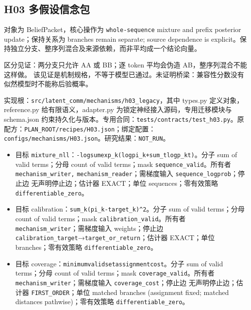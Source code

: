 \documentclass[
  10pt,
]{article}
\begin{document}
\subsection{H03
多假设信念包}\label{h03-ux591aux5047ux8bbeux4fe1ux5ff5ux5305}

对象为 BeliefPacket，核心操作为 \nolinkurl{whole-sequence} mixture and
prefix posterior update；保持关系为 branches remain separate; source
dependence is
explicit。保持独立分支、整序列混合及来源依赖，而非平均成一个结论向量。

区分见证：两分支只允许 AA 或 BB；逐 token 平均会伪造
AB，整序列混合不能这样做。
该见证是机制规格，不等于模型已通过。未证明桥梁：兼容性分数没有似然模型时不能称后验概率。

实现根：{\small\nolinkurl{src/latent_comm/mechanisms/h03_legacy}}，其中
types.py 定义对象，reference.py 给有限语义，adapter.py
为锁定神经接入源码，专用迁移模块与 schema.json
约束持久化与版本。专用合同：{\small\nolinkurl{tests/contracts/test_h03.py}}。原配方：{\small\nolinkurl{PLAN_ROOT/recipes/H03.json}}；绑定配置：{\small\nolinkurl{configs/mechanisms/H03.json}}。研究结果：\nolinkurl{NOT_RUN}。

\begin{itemize}
\item
  目标
  \nolinkurl{mixture_nll}：{\small\nolinkurl{-logsumexp_k(log}\hspace{0.333em}\nolinkurl{pi_k}\hspace{0.333em}\nolinkurl{+}\hspace{0.333em}\nolinkurl{sum_t}\hspace{0.333em}\nolinkurl{log}\hspace{0.333em}\nolinkurl{p_kt)}}。分子
  sum of valid terms；分母 count of valid terms；mask
  \nolinkurl{sequence_valid}。所有者 \nolinkurl{mechanism_writer,}
  \nolinkurl{mechanism_reader}；需梯度输入
  \nolinkurl{sequence_logprob}；停止边 无声明停止边；估计器 EXACT；单位
  sequences；零有效策略 \nolinkurl{differentiable_zero}。
\item
  目标
  calibration：{\small\nolinkurl{sum_k}\hspace{0.333em}\nolinkurl{(pi_k-target_k)^2}}。分子
  sum of valid terms；分母 count of valid terms；mask
  \nolinkurl{calibration_valid}。所有者
  \nolinkurl{mechanism_writer}；需梯度输入 weights；停止边
  \nolinkurl{calibration_target}→\nolinkurl{target_or_return}；估计器
  EXACT；单位 branches；零有效策略 \nolinkurl{differentiable_zero}。
\item
  目标
  coverage：{\small\nolinkurl{minimum}\hspace{0.333em}\nolinkurl{valid}\hspace{0.333em}\nolinkurl{set}\hspace{0.333em}\nolinkurl{assignment}\hspace{0.333em}\nolinkurl{cost}}。分子
  sum of valid terms；分母 count of valid terms；mask
  \nolinkurl{coverage_valid}。所有者
  \nolinkurl{mechanism_writer}；需梯度输入
  \nolinkurl{coverage_cost}；停止边 无声明停止边；估计器
  \nolinkurl{FIRST_ORDER}；单位 matched branches (assignment fixed;
  matched distances pathwise)；零有效策略
  \nolinkurl{differentiable_zero}。
\end{itemize}
\end{document}

